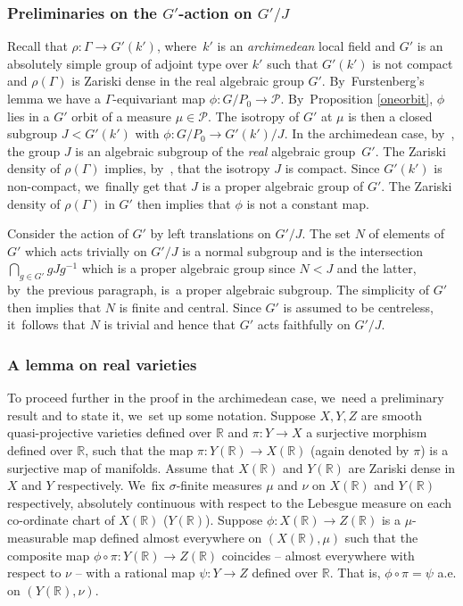 \documentclass[JEP,XML,SOM,Unicode,published]{cedram}
\theoremstyle{definition}
\newcommand{\field}[1]{\mathbb{#1}}
\newcommand{\R}{\field{R}}
\let\G\Gamma
\begin{document}

\subsubsection{Preliminaries on the $G'$-action on $G'/J$}
Recall that $\rho : \G \to G'(k')$, where~$k'$ is an \emph{archimedean} local field and $G'$ is an absolutely simple group of adjoint type over $k'$ such that $G'(k')$ is not compact and $\rho (\G)$ is Zariski dense in the real algebraic group $G'$. By~Furstenberg's lemma we have a $\G$-equivariant map $\phi : G/P_0\to \mathcal{P}$. By~Proposition \ref{oneorbit}, $\phi $ lies in a $G'$ orbit of a measure $\mu \in \mathcal{P}$. The isotropy of $G'$ at $\mu$ is then a closed subgroup $J < G'(k')$ with $\phi : G/P_0 \to G'(k')/J$. In the archimedean case, by~\cite[Cor.\,(3.2.18)]{Z}, the group $J$ is an algebraic subgroup of the \emph{real} algebraic group~$G'$. The Zariski density of $\rho (\G)$ implies, by~\cite[Cor.\,(3.2.19)]{Z}, that the isotropy $J$ is compact. Since $G'(k')$ is non-compact, we~finally get that $J$ is a proper algebraic group of $G'$. The Zariski density of $\rho(\G)$ in $G'$ then implies that $\phi $ is not a constant map.

Consider the action of $G'$ by left translations on $G'/J$. The set $N$ of elements of $G'$ which acts trivially on $G'/J$ is a normal subgroup and is the intersection $\bigcap_{g\in G'} gJg^{-1}$ which is a proper algebraic group since $N< J$ and the latter, by~the previous paragraph, is~a proper algebraic subgroup. The simplicity of $G'$ then implies that $N$ is finite and central. Since $G'$ is assumed to be centreless, it~follows that $N$ is trivial and hence that $G'$ acts faithfully on $G'/J$.

\subsubsection{A lemma on real varieties}
To proceed further in the proof in the archi\-me\-dean case, we~need a preliminary result and to state it, we~set up some notation. Suppose $X,Y, Z$ are smooth quasi-projective varieties defined over $\R$ and $\pi: Y \to X$ a surjective morphism defined over $\R$, such that the map $\pi: Y(\R)\to X(\R)$ (again denoted by $\pi$) is a surjective map of manifolds. Assume that $X(\R)$ and $Y(\R)$ are Zariski dense in $X$ and $Y$ respectively. We~fix $\sigma$-finite measures $\mu $ and $\nu $ on $X(\R)$ and $Y(\R)$ respectively, absolutely continuous with respect to the Lebesgue measure on each co-ordinate chart of $X(\R)$ (\resp $Y(\R)$). Suppose $\phi: X(\R)\to Z(\R)$ is a $\mu$\nobreakdash-measurable map defined almost everywhere on $(X(\R), \mu)$ such that the composite map $\phi \circ \pi: Y(\R)\to Z(\R)$ coincides -- almost everywhere with respect to $\nu$ -- with a rational map $\psi: Y \to Z$ defined over $\R$.
That is, $\phi \circ \pi=\psi$ a.e. on $(Y(\R),\nu)$.
\end{document}
